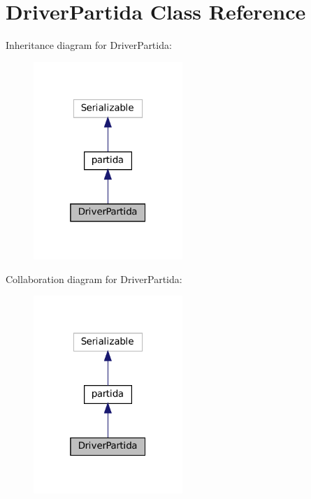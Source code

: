 \section{Driver\+Partida Class Reference}
\label{class_dominio_1_1controladores_1_1_drivers_1_1_driver_partida}


Inheritance diagram for Driver\+Partida\+:
\nopagebreak
\begin{figure}[H]
\begin{center}
\leavevmode
\includegraphics[width=160pt]{class_dominio_1_1controladores_1_1_drivers_1_1_driver_partida__inherit__graph}
\end{center}
\end{figure}


Collaboration diagram for Driver\+Partida\+:
\nopagebreak
\begin{figure}[H]
\begin{center}
\leavevmode
\includegraphics[width=160pt]{class_dominio_1_1controladores_1_1_drivers_1_1_driver_partida__coll__graph}
\end{center}
\end{figure}
